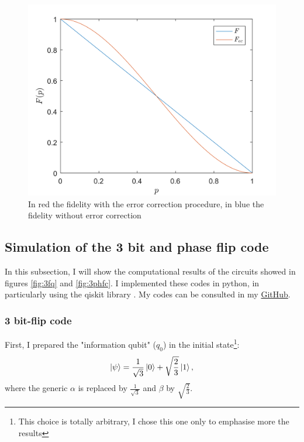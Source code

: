 \begin{figure}[h!]
    \centering
    \includegraphics[scale=0.07]{Mainmatter/images/fidelity.png}
    \caption{In red the fidelity with the error correction procedure, in blue the fidelity without error correction}%
    \label{fig:fidelity3qbit}
\end{figure}


\subsection{Simulation of the 3 bit and phase flip code}
In this subsection, I will show the computational results of the circuits showed in figures \ref{fig:3fq} and \ref{fig:3phfc}. I implemented these codes in python, in particularly using the qiskit library \cite{Qiskit}. My codes can be consulted in my \href{https://github.com/AlexsashaV4/bachelor_thesis_QEC.git}{GitHub}.
\subsubsection*{3 bit-flip code}

First, I prepared the "information qubit" ($q_0$) in the initial state\footnote{This choice is totally arbitrary, I chose this one only to emphasise more the results}: \begin{equation}
    \ket{\psi}=\frac{1}{\sqrt{3}}\ket{0} + \sqrt{\frac{2}{3}} \ket{1},
    \label{eq:initialstate}
\end{equation}
where the generic $\alpha$ is replaced by $\frac{1}{\sqrt{3}}$ and $\beta$ by $\sqrt{\frac{2}{3}}$.


